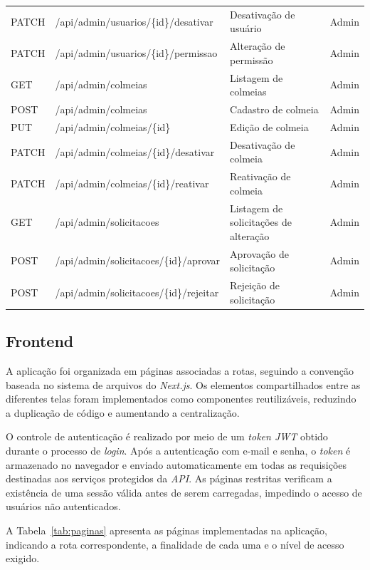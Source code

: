 \documentclass[12pt]{unisenaiclass}
\begin{document}
\begin{longtable}{llp{5cm}l}
PATCH & /api/admin/usuarios/\{id\}/desativar        & Desativação de usuário & Admin \\
PATCH & /api/admin/usuarios/\{id\}/permissao        & Alteração de permissão & Admin \\
GET   & /api/admin/colmeias                        & Listagem de colmeias & Admin \\
POST  & /api/admin/colmeias                        & Cadastro de colmeia & Admin \\
PUT   & /api/admin/colmeias/\{id\}                  & Edição de colmeia & Admin \\
PATCH & /api/admin/colmeias/\{id\}/desativar        & Desativação de colmeia & Admin \\
PATCH & /api/admin/colmeias/\{id\}/reativar         & Reativação de colmeia & Admin \\
GET   & /api/admin/solicitacoes                    & Listagem de solicitações de alteração & Admin \\
POST  & /api/admin/solicitacoes/\{id\}/aprovar      & Aprovação de solicitação & Admin \\
POST  & /api/admin/solicitacoes/\{id\}/rejeitar     & Rejeição de solicitação & Admin \\
\hline
\end{longtable}

\subsection{Frontend}

A aplicação foi organizada em páginas associadas a rotas, seguindo a convenção baseada no sistema de arquivos do \textit{Next.js}. Os elementos compartilhados entre as diferentes telas foram implementados como componentes reutilizáveis, reduzindo a duplicação de código e aumentando a centralização.

O controle de autenticação é realizado por meio de um \textit{token JWT} obtido durante o processo de \textit{login}. Após a autenticação com e-mail e senha, o \textit{token} é armazenado no navegador e enviado automaticamente em todas as requisições destinadas aos serviços protegidos da \textit{API}. As páginas restritas verificam a existência de uma sessão válida antes de serem carregadas, impedindo o acesso de usuários não autenticados.

A Tabela~\ref{tab:paginas} apresenta as páginas implementadas na aplicação, indicando a rota correspondente, a finalidade de cada uma e o nível de acesso exigido.
\end{document}
